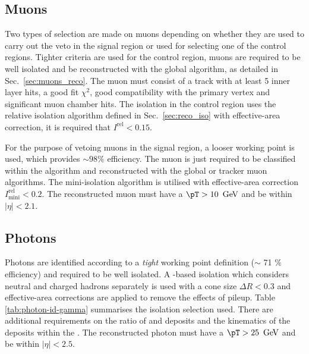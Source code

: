 \subsection{Muons}
\label{sec:muon-id}
Two types of selection are made on muons depending on whether they are
used to carry out the veto in the signal region or used for selecting
one of the control regions. Tighter criteria are used for the control
region, muons are required to be well isolated and be
reconstructed with the global algorithm, as detailed in
Sec.~\ref{sec:muons_reco}. The muon must consist of a track
with at least 5 inner layer hits, a good fit $\chi^2$, good compatibility with
the primary vertex and significant muon chamber hits. The isolation in
the control region uses the relative isolation algorithm
defined in Sec.~\ref{sec:reco_iso} with effective-area
correction, it is required that $I^{\textrm{rel}}<0.15$.  

For the purpose of vetoing muons in the signal region, a looser
working point is used, which provides $\sim98\%$ efficiency. The
muon is just required to be classified within the \PF algorithm and
reconstructed with the global or tracker muon
algorithms. The
mini-isolation algorithm is utilised with effective-area \PU
correction $I^{\textrm{rel}}_{\textrm{mini}} < 0.2$. The reconstructed
muon must have a $\pT>10~\gev$ and be within $|\eta|<2.1$.

\subsection{Photons}
\label{sec:photon-id}

Photons are identified according to a \emph{tight} working point
definition ($\sim$ 71 $\%$ efficiency) and required to be well
isolated.  A \PF-based isolation which considers neutral and charged
hadrons separately is used with a cone size $\Delta R<0.3$
and effective-area corrections are applied to remove the
effects of pileup.  Table \ref{tab:photon-id-gamma}
summarises the isolation selection used. There are additional
requirements on the ratio of \HCAL and \ECAL deposits and the
kinematics of the deposits within the \ECAL. The reconstructed
photon must have a $\pT>25~\gev$ and be within $|\eta|<2.5$.

